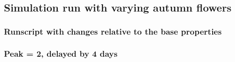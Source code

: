 \subsection{Simulation run with varying autumn flowers}
	\label{chap:sim_R2}
	\subsubsection{Runscript with changes relative to the base properties}
		
	\subsubsection{Peak = 2, delayed by 4 days}
		\label{chap:sim_R2_1_1}
